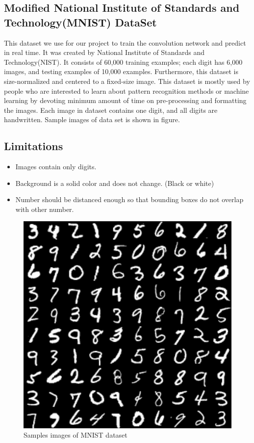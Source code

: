\documentclass[12pt, letterpaper]{article}
\begin{document}
\subsection{Modified National Institute of Standards and Technology(MNIST) DataSet}

This dataset we use for our project to train the convolution network and predict in real time. It was created by National Institute of Standards and Technology(NIST). It consists of 60,000 training examples; each digit has 6,000 images, and testing examples of 10,000 examples. Furthermore, this dataset is size-normalized and centered to a fixed-size image. This dataset is mostly used by people who are interested to learn about pattern recognition methods or machine learning by devoting minimum amount of time on pre-processing and formatting the images. Each image in dataset contains one digit, and all digits are handwritten. Sample images of data set is shown in figure.


\subsection{Limitations}
	\begin{itemize}
		\item Images contain only digits.
		\item Background is a solid color and does not change. (Black or white)
		\item Number should be distanced enough so that bounding boxes do not overlap with other number.
	\end{itemize}

\begin{figure}[!h]
	\begin{center}	
		\includegraphics[scale = 0.5]{mnist-digits-small.png}
		\caption{ \cite{Classifying MNIST Digits} Samples images of MNIST dataset }
	\end{center}
\end{figure}  
\end{document}
